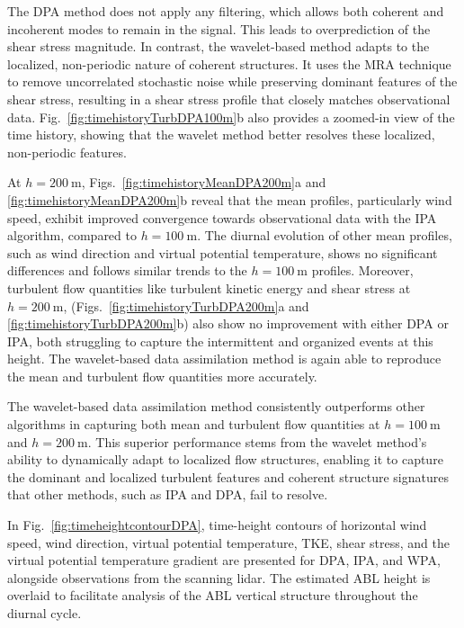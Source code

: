 The DPA method does not apply any filtering, which allows both coherent and incoherent modes to remain in the signal. This leads to overprediction of the shear stress magnitude. In contrast, the wavelet-based method adapts to the localized, non-periodic nature of coherent structures. It uses the MRA technique to remove uncorrelated stochastic noise while preserving dominant features of the shear stress, resulting in a shear stress profile that closely matches observational data. Fig.~\ref{fig:timehistoryTurbDPA100m}b also provides a zoomed-in view of the time history, showing that the wavelet method better resolves these localized, non-periodic features.

At $h=200~\mathrm{m}$, Figs.~\ref{fig:timehistoryMeanDPA200m}a and \ref{fig:timehistoryMeanDPA200m}b reveal that the mean profiles, particularly wind speed, exhibit improved convergence towards observational data with the IPA algorithm, compared to $h=100~\mathrm{m}$. The diurnal evolution of other mean profiles, such as wind direction and virtual potential temperature, shows no significant differences and follows similar trends to the $h=100~\mathrm{m}$ profiles. Moreover, turbulent flow quantities like turbulent kinetic energy and shear stress at $h=200~\mathrm{m}$, (Figs.~\ref{fig:timehistoryTurbDPA200m}a and \ref{fig:timehistoryTurbDPA200m}b) also show no improvement with either DPA or IPA, both struggling to capture the intermittent and organized events at this height. The wavelet-based data assimilation method is again able to reproduce the mean and turbulent flow quantities more accurately.

The wavelet-based data assimilation method consistently outperforms other algorithms in capturing both mean and turbulent flow quantities at $h=100~\mathrm{m}$ and $h=200~\mathrm{m}$. This superior performance stems from the wavelet method's ability to dynamically adapt to localized flow structures, enabling it to capture the dominant and localized turbulent features and coherent structure signatures that other methods, such as IPA and DPA, fail to resolve. 

In Fig.~\ref{fig:timeheightcontourDPA}, time-height contours of horizontal wind speed, wind direction, virtual potential temperature, TKE, shear stress, and the virtual potential temperature gradient are presented for DPA, IPA, and WPA, alongside observations from the scanning lidar. The estimated ABL height is overlaid to facilitate analysis of the ABL vertical structure throughout the diurnal cycle.

